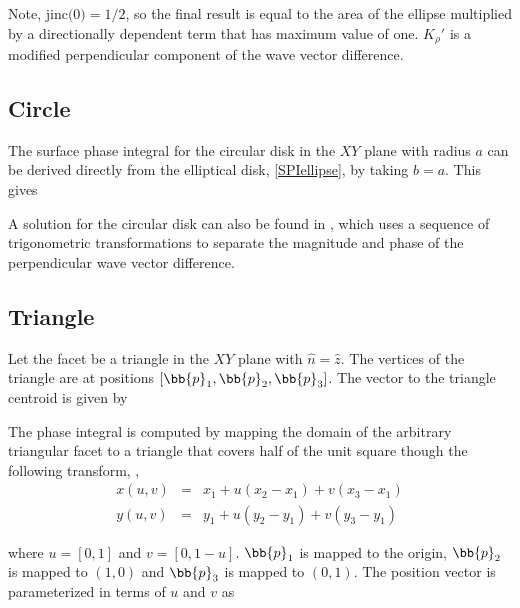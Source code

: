 Note, $\textrm{jinc(0)} = 1/2$, so the final result is equal to the area of the ellipse multiplied by a directionally dependent term that has maximum value of one. $K_{\rho}'$ is a modified perpendicular component of the wave vector difference.  


\subsection{Circle}

The surface phase integral for the circular disk in the $XY$ plane with radius $a$ can be derived directly from the elliptical disk, \eqref{SPIellipse}, by taking $b = a$.  This gives

A solution for the circular disk can also be found in \cite{trott1988disk}, which uses a sequence of trigonometric transformations to separate the magnitude and phase of the perpendicular wave vector difference. %

\subsection{Triangle}

Let the facet be a triangle in the $XY$ plane with $\hat{n} = \hat{z}$. The vertices of the triangle are at positions $[\bb{p}_1, \bb{p}_2, \bb{p}_3]$. The vector to the triangle centroid is given by 

The phase integral is computed by mapping the domain of the arbitrary triangular facet to a triangle that covers half of the unit square though the following transform, \cite{triangleint},
\begin{eqnarray}
x(u,v) &=& x_1 + u(x_2 - x_1) + v(x_3 - x_1) \\
y(u,v) &=& y_1 + u(y_2 - y_1) + v(y_3 - y_1)  
\end{eqnarray}

\noindent where $u = [0,1]$ and $v = [0,1-u]$.  $\bb{p}_1$ is mapped to the origin, $\bb{p}_2$ is mapped to $(1,0)$ and $\bb{p}_3$ is mapped to $(0,1)$. The position vector is parameterized in terms of $u$ and $v$ as 

